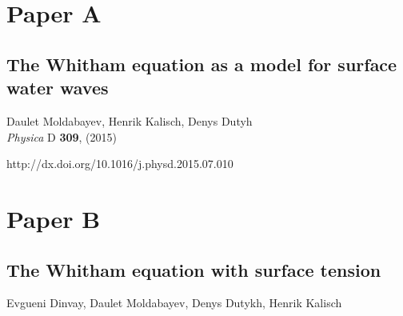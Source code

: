 

\chapter*{Paper A}
\section*{The Whitham equation as a model for surface water waves}

\noindent Daulet Moldabayev, Henrik Kalisch, Denys Dutyh \\

\noindent \textit{Physica} D \textbf{309}, (2015)

\noindent http://dx.doi.org/10.1016/j.physd.2015.07.010
\cleardoublepage



\chapter*{Paper B}
\section*{The Whitham equation with surface tension}

\noindent Evgueni Dinvay, Daulet Moldabayev, Denys Dutykh, Henrik Kalisch\\

\cleardoublepage


